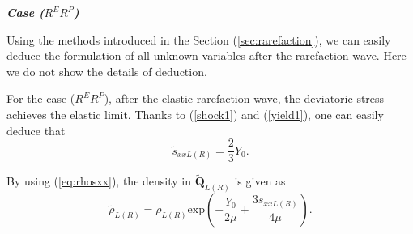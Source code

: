 \documentclass{article}
\numberwithin{equation}{section}
\numberwithin{table}{section}
\begin{document}


	\emph{\textbf{Case ($R^{E}R^{P}$)}}

Using the methods introduced in  the Section (\ref{sec:rarefaction}), we can easily deduce the formulation of all unknown variables after the rarefaction wave. Here we do not show the details of deduction.


For the case ($R^{E}R^{P}$),  after the elastic rarefaction wave, the deviatoric stress achieves the elastic limit. Thanks to (\ref{shock1}) and (\ref{yield1}), one can easily deduce that
\begin{equation*}
\tilde{s}_{xxL(R)} = \frac{2}{3}Y_0.
\end{equation*}

By using (\ref{eq:rhosxx}), the density in $\tilde{\mathbf{Q}}_{L(R)}$ is given as
\begin{equation*}
\tilde{\rho}_{L(R)} = \rho_{L(R)} \text{exp}\left(-\frac{Y_0}{2\mu}+\frac{3 s_{xxL(R)}}{4\mu}\right).
\end{equation*}
\end{document}
